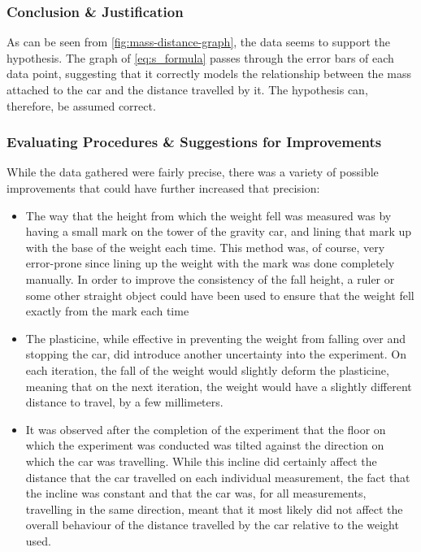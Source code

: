 \documentclass[titlepage,12pt]{article}
\begin{document}
\subsubsection{Conclusion \& Justification}

As can be seen from \autoref{fig:mass-distance-graph}, the data seems to support the
hypothesis. The graph of \autoref{eq:s_formula} passes through the error bars of each data
point, suggesting that it correctly models the relationship between the mass attached to the
car and the distance travelled by it. The hypothesis can, therefore, be assumed correct.  

\subsubsection{Evaluating Procedures \& Suggestions for Improvements}

While the data gathered were fairly precise, there was a variety of possible improvements
that could have further increased that precision:

\begin{itemize}
    \item The way that the height from which the weight fell was measured was by having a
        small mark on the tower of the gravity car, and  lining that mark up with the base
        of the weight each time. This method was, of course, very error-prone since lining
        up the weight with the mark was done completely manually. In order to improve the
        consistency of the fall height, a ruler or some other straight object could have
        been used to ensure that the weight fell exactly from the mark each time

    \item The plasticine, while effective in preventing the weight from falling over and
        stopping the car, did introduce another uncertainty into the experiment. On each
        iteration, the fall of the weight would slightly deform the plasticine, meaning that
        on the next iteration, the weight would have a slightly different distance to
        travel, by a few millimeters. 

    \item It was observed after the completion of the experiment that the floor on which the
        experiment was conducted was tilted against the direction on which the car was
        travelling. While this incline did certainly affect the distance that the car
        travelled on each individual measurement, the fact that the incline was constant and
        that the car was, for all measurements, travelling in the same direction, meant that
        it most likely did not affect the overall behaviour of the distance travelled by the
        car relative to the weight used.  
\end{itemize}
\end{document}
